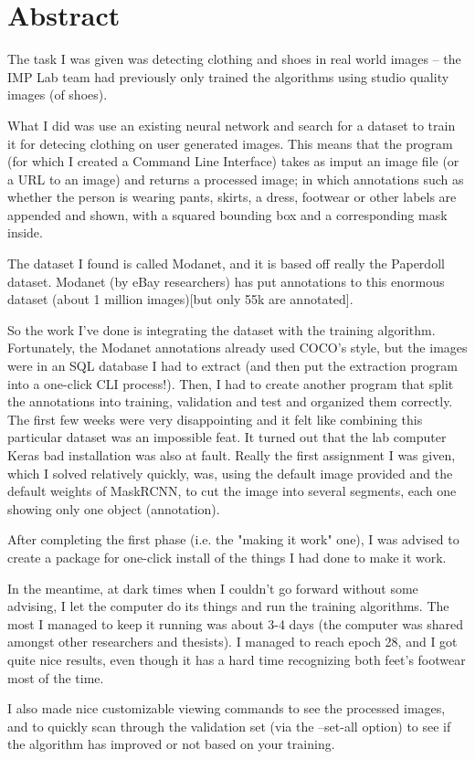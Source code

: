 \chapter*{Abstract}

The task I was given was detecting clothing and shoes in real world images -- the IMP Lab team had previously only trained the algorithms using studio quality images (of shoes).

What I did was use an existing neural network and search for a dataset to train it for detecing clothing on user generated images. This means that the program (for which I created a Command Line Interface) takes as imput an image file (or a URL to an image) and returns a processed image; in which annotations such as whether the person is wearing pants, skirts, a dress, footwear or other labels are appended and shown, with a squared bounding box and a corresponding mask inside.

The dataset I found is called Modanet, and it is based off really the Paperdoll dataset. Modanet (by eBay researchers) has put annotations to this enormous dataset (about 1 million images)[but only 55k are annotated].

So the work I've done is integrating the dataset with the training algorithm. Fortunately, the Modanet annotations already used COCO's style, but the images were in an SQL database I had to extract (and then put the extraction program into a one-click CLI process!).
Then, I had to create another program that split the annotations into training, validation and test and organized them correctly. The first few weeks were very disappointing and it felt like combining this particular dataset was an impossible feat. It turned out that the lab computer Keras bad installation was also at fault.
Really the first assignment I was given, which I solved relatively quickly, was, using the default image provided and the default weights of MaskRCNN, to cut the image into several segments, each one showing only one object (annotation).

After completing the first phase (i.e. the "making it work" one), I was advised to create a package for one-click install of the things I had done to make it work.

In the meantime, at dark times when I couldn't go forward without some advising, I let the computer do its things and run the training algorithms. The most I managed to keep it running was about 3-4 days (the computer was shared amongst other researchers and thesists). I managed to reach epoch 28, and I got quite nice results, even though it has a hard time recognizing both feet's footwear most of the time. 

I also made nice customizable viewing commands to see the processed images, and to quickly scan through the validation set (via the --set-all option) to see if the algorithm has improved or not based on your training.